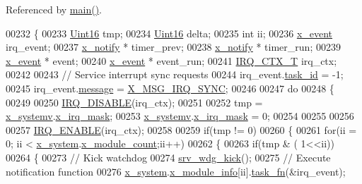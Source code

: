 Referenced by \hyperlink{a00048_source_l00080}{main()}.


\begin{DoxyCode}
00232 \{
00233     \hyperlink{a00072_a59a9f6be4562c327cbfb4f7e8e18f08b}{Uint16}            tmp;
00234     \hyperlink{a00072_a59a9f6be4562c327cbfb4f7e8e18f08b}{Uint16}            delta;
00235     \textcolor{keywordtype}{int}               ii;
00236     \hyperlink{a00036_de/d37/a00849}{x\_event}           irq\_event;
00237     \hyperlink{a00036_df/d4c/a00851}{x\_notify}          * timer\_prev;
00238     \hyperlink{a00036_df/d4c/a00851}{x\_notify}          * timer\_run;
00239     \hyperlink{a00036_de/d37/a00849}{x\_event}           * event;
00240     \hyperlink{a00036_de/d37/a00849}{x\_event}           * event\_run;
00241     \hyperlink{a00033_a6d4f0a7397640f5b011ca9c39d47dc72}{IRQ\_CTX\_T}         irq\_ctx;
00242 
00243     \textcolor{comment}{// Service interrupt sync requests}
00244     irq\_event.\hyperlink{a00036_a21b41e494a28583d4da10f1afb1c5328}{task\_id} = -1;
00245     irq\_event.\hyperlink{a00036_adf9665938515a20c283eea2c978cf80d}{message} = \hyperlink{a00036_a104f1137aafb33160da80932fe63c40d}{X\_MSG\_IRQ\_SYNC};
00246 
00247     \textcolor{keywordflow}{do}
00248     \{
00249 
00250         \hyperlink{a00033_a357168bbe78739811cdb7b5576714ca6}{IRQ\_DISABLE}(irq\_ctx);
00251 
00252         tmp = \hyperlink{a00037_ad839c033d3d00cdcc6032038182be270}{x\_systemv}.\hyperlink{a00037_a1385e454a9fbfdfe2af2b8a743789483}{x\_irq\_mask};
00253         \hyperlink{a00037_ad839c033d3d00cdcc6032038182be270}{x\_systemv}.\hyperlink{a00037_a1385e454a9fbfdfe2af2b8a743789483}{x\_irq\_mask} = 0;
00254 
00255 
00256 
00257         \hyperlink{a00033_abc8e0f43382f8b0fdf60d35a93c20c57}{IRQ\_ENABLE}(irq\_ctx);
00258 
00259         \textcolor{keywordflow}{if}(tmp != 0)
00260         \{
00261             \textcolor{keywordflow}{for}(ii = 0; ii < \hyperlink{a00037_ae4d7967b507ca26e3ee1231215b03321}{x\_system}.\hyperlink{a00037_a80c19e87a59b3ee9def711195641cd26}{x\_module\_count};ii++)
00262             \{
00263                 \textcolor{keywordflow}{if}(tmp & ( 1<<ii))
00264                 \{
00273                     \textcolor{comment}{// Kick watchdog}
00274                     \hyperlink{a00067_a710d148845397582739d170341f3d3d9}{srv\_wdg\_kick}();
00275                     \textcolor{comment}{// Execute notification function}
00276                     \hyperlink{a00037_ae4d7967b507ca26e3ee1231215b03321}{x\_system}.\hyperlink{a00037_a6724d1e1430a0e89c134b30152988385}{x\_module\_info}[ii].\hyperlink{a00037_ab14ce9c8fe0edb516f7f3d4e1e3a8854}{task\_fn}(&irq\_event);

\end{DoxyCode}
